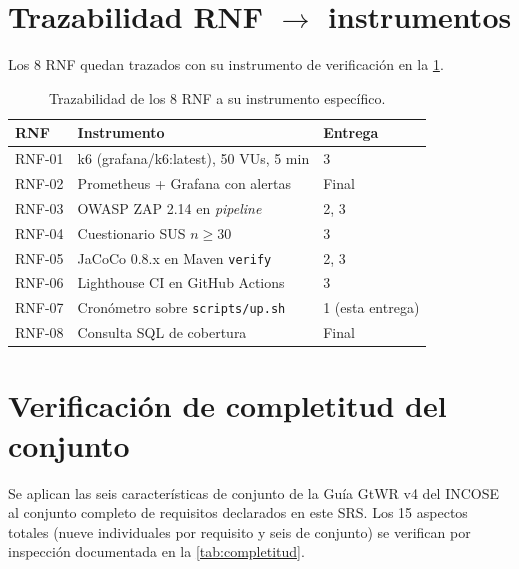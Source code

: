 \documentclass[11pt,a4paper,twoside]{report}
\begin{document}
\section{Trazabilidad RNF $\to$ instrumentos}

Los 8 RNF quedan trazados con su instrumento de verificaci\'on en la \cref{tab:rnfinstr}.

\begin{table}[htbp]
    \centering
    \small
    \caption{Trazabilidad de los 8 RNF a su instrumento espec\'ifico.}
    \label{tab:rnfinstr}
    \begin{tabularx}{\textwidth}{@{}lXl@{}}
        \toprule
        \textbf{RNF} & \textbf{Instrumento} & \textbf{Entrega} \\
        \midrule
        RNF-01 & k6 (grafana/k6:latest), 50 VUs, 5 min & 3 \\
        RNF-02 & Prometheus + Grafana con alertas         & Final \\
        RNF-03 & OWASP ZAP 2.14 en \emph{pipeline}          & 2, 3 \\
        RNF-04 & Cuestionario SUS $n \geq 30$                & 3 \\
        RNF-05 & JaCoCo 0.8.x en Maven \texttt{verify}    & 2, 3 \\
        RNF-06 & Lighthouse CI en GitHub Actions          & 3 \\
        RNF-07 & Cron\'ometro sobre \texttt{scripts/up.sh}   & 1 (esta entrega) \\
        RNF-08 & Consulta SQL de cobertura                 & Final \\
        \bottomrule
    \end{tabularx}
\end{table}

\section{Verificaci\'on de completitud del conjunto}

Se aplican las seis caracter\'isticas de conjunto de la Gu\'ia GtWR v4 del INCOSE \cite{incose2023requirements} al conjunto completo de requisitos declarados en este SRS. Los 15 aspectos totales (nueve individuales por requisito y seis de conjunto) se verifican por inspecci\'on documentada en la \cref{tab:completitud}.
\end{document}
